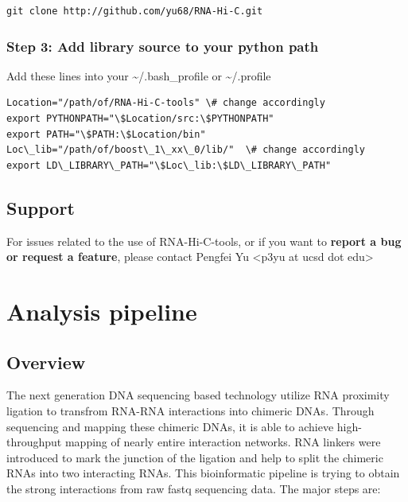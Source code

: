 \documentclass[letterpaper,10pt,english]{sphinxmanual}
\begin{document}
\begin{Verbatim}[commandchars=\\\{\}]
git clone http://github.com/yu68/RNA-Hi-C.git
\end{Verbatim}


\subsection{Step 3: Add library source to your python path}
\label{RNA-Hi-C-tools:step-3-add-library-source-to-your-python-path}
Add these lines into your \textasciitilde{}/.bash\_profile or \textasciitilde{}/.profile

\begin{Verbatim}[commandchars=\\\{\}]
Location="/path/of/RNA-Hi-C-tools" \# change accordingly
export PYTHONPATH="\$Location/src:\$PYTHONPATH"
export PATH="\$PATH:\$Location/bin"
Loc\_lib="/path/of/boost\_1\_xx\_0/lib/"  \# change accordingly
export LD\_LIBRARY\_PATH="\$Loc\_lib:\$LD\_LIBRARY\_PATH"
\end{Verbatim}


\section{Support}
\label{RNA-Hi-C-tools:support}
For issues related to the use of RNA-Hi-C-tools, or if you want to \textbf{report a bug or request a feature}, please contact Pengfei Yu \textless{}p3yu at ucsd dot edu\textgreater{}


\chapter{Analysis pipeline}
\label{Analysis_pipeline:analysis-pipeline}\label{Analysis_pipeline::doc}

\section{Overview}
\label{Analysis_pipeline:overview}
The next generation DNA sequencing based technology utilize RNA proximity ligation to transfrom RNA-RNA interactions into chimeric DNAs. Through sequencing and mapping these chimeric DNAs, it is able to achieve high-throughput mapping of nearly entire interaction networks. RNA linkers were introduced to mark the junction of the ligation and help to split the chimeric RNAs into two interacting RNAs.
This bioinformatic pipeline is trying to obtain the strong interactions from raw fastq sequencing data. The major steps are:
\end{document}
